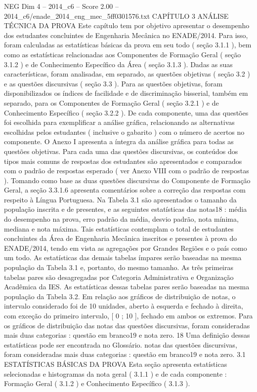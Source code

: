 \begin{textsample}{NEG Dim 4 – 2014\_c6 – Score 2.00 – 2014\_c6/enade\_2014\_eng\_mec\_5ff0301576.txt}  \label{ex:f4_neg_284}
CAPÍTULO 3 ANÁLISE TÉCNICA DA PROVA Este capítulo tem por objetivo apresentar o desempenho dos estudantes concluintes de Engenharia Mecânica no ENADE/2014.
Para isso, foram calculadas as estatísticas básicas da prova em seu todo ( seção 3.1.1 ), bem como as estatísticas relacionadas aos Componentes de Formação Geral ( seção 3.1.2 ) e de Conhecimento Específico da Área ( seção 3.1.3 ).
Dadas as suas características, foram analisadas, em separado, as questões objetivas ( seção 3.2 ) e as questões discursivas ( seção 3.3 ).
Para as questões objetivas, foram disponibilizados os índices de facilidade e de discriminação bisserial, também em separado, para os Componentes de Formação Geral ( seção 3.2.1 ) e de Conhecimento Específico ( seção 3.2.2 ).
De cada componente, uma das questões foi escolhida para exemplificar a análise gráfica, relacionando as alternativas escolhidas pelos estudantes ( inclusive o gabarito ) com o número de acertos no componente.
O Anexo I apresenta a íntegra da análise gráfica para todas as questões objetivas.
Para cada uma das questões discursivas, os conteúdos dos tipos mais comuns de respostas dos estudantes são apresentados e comparados com o padrão de respostas esperado ( ver Anexo VIII com o padrão de respostas ).
Tomando como base as duas questões discursivas do Componente de Formação Geral, a seção 3.3.1.6 apresenta comentários sobre a correção das respostas com respeito à Língua Portuguesa.
Na Tabela 3.1 são apresentados o tamanho da população inscrita e de presentes, e as seguintes estatísticas das notas18 : média do desempenho na prova, erro padrão da média, desvio padrão, nota mínima, mediana e nota máxima.
Tais estatísticas contemplam o total de estudantes concluintes da Área de Engenharia Mecânica inscritos e presentes à prova do ENADE/2014, tendo em vista as agregações por Grandes Regiões e o país como um todo.
As estatísticas das demais tabelas ímpares serão baseadas na mesma população da Tabela 3.1 e, portanto, do mesmo tamanho.
As três primeiras tabelas pares são desagregadas por Categoria Administrativa e Organização Acadêmica da IES.
As estatísticas dessas tabelas pares serão baseadas na mesma população da Tabela 3.2.
Em relação aos gráficos de distribuição de notas, o intervalo considerado foi de 10 unidades, aberto à esquerda e fechado à direita, com exceção do primeiro intervalo, [ 0 ; 10 ], fechado em ambos os extremos.
Para os gráficos de distribuição das notas das questões discursivas, foram consideradas mais duas categorias : questão em branco19 e nota zero. 18 Uma definição dessas estatísticas pode ser encontrada no Glossário. notas das questões discursivas, foram consideradas mais duas categorias : questão em branco19 e nota zero. 3.1 ESTATÍSTICAS BÁSICAS DA PROVA Esta seção apresenta estatísticas selecionadas e histogramas da nota geral ( 3.1.1 ) e de cada componente : Formação Geral ( 3.1.2 ) e Conhecimento Específico ( 3.1.3 ).

\end{textsample}
